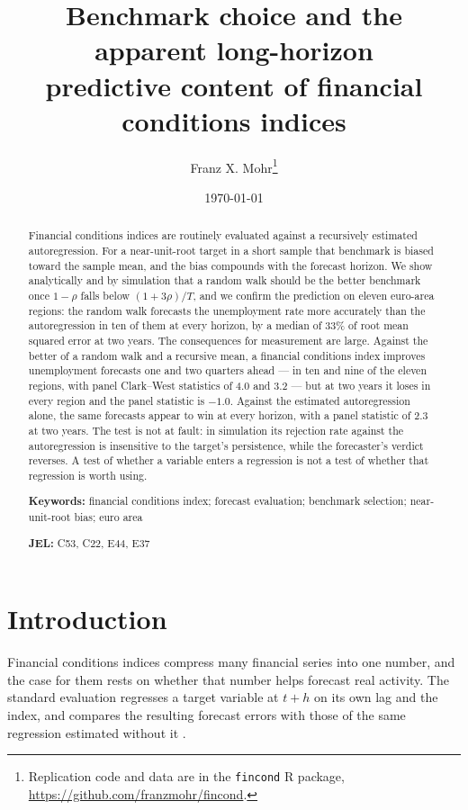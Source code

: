\documentclass[12pt]{article}
\title{Benchmark choice and the apparent long-horizon\\
predictive content of financial conditions indices}
\author{Franz X. Mohr\thanks{Replication code and data are in the
\texttt{fincond} R package, \url{https://github.com/franzmohr/fincond}.}}
\date{\today}
\begin{document}
\maketitle

\begin{abstract}
\noindent Financial conditions indices are routinely evaluated against a
recursively estimated autoregression. For a near-unit-root target in a short
sample that benchmark is biased toward the sample mean, and the bias compounds
with the forecast horizon. We show analytically and by simulation that a random
walk should be the better benchmark once $1-\rho$ falls below $(1+3\rho)/T$,
and we confirm the prediction on eleven euro-area regions: the random walk
forecasts the unemployment rate more accurately than the autoregression in ten
of them at every horizon, by a median of 33\% of root mean squared error at two
years. The consequences for measurement are large. Against the better of a
random walk and a recursive mean, a financial conditions index improves
unemployment forecasts one and two quarters ahead --- in ten and nine of the
eleven regions, with panel Clark--West statistics of 4.0 and 3.2 --- but at two
years it loses in every region and the panel statistic is $-1.0$. Against the
estimated autoregression alone, the same forecasts appear to win at every
horizon, with a panel statistic of 2.3 at two years. The test is not at fault:
in simulation its rejection rate against the autoregression is insensitive to
the target's persistence, while the forecaster's verdict reverses. A test of
whether a variable enters a regression is not a test of whether that regression
is worth using.

\vspace{1em}
\noindent \textbf{Keywords:} financial conditions index; forecast evaluation;
benchmark selection; near-unit-root bias; euro area

\noindent \textbf{JEL:} C53, C22, E44, E37
\end{abstract}

\section{Introduction}

Financial conditions indices compress many financial series into one number,
and the case for them rests on whether that number helps forecast real
activity. The standard evaluation regresses a target variable at $t+h$ on its
own lag and the index, and compares the resulting forecast errors with those of
the same regression estimated without it
\citep{koop2014, hatzius2010, stock2002}.
\end{document}
